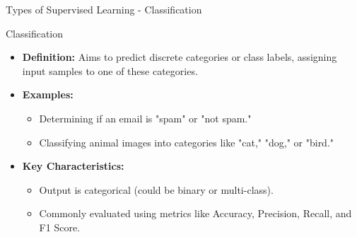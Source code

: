 \documentclass[aspectratio=169]{beamer}
\begin{document}
\begin{frame}[fragile]{Types of Supervised Learning - Classification}
    \begin{block}{Classification}
        \begin{itemize}
            \item \textbf{Definition:} Aims to predict discrete categories or class labels, assigning input samples to one of these categories.
            \item \textbf{Examples:} 
                \begin{itemize}
                    \item Determining if an email is "spam" or "not spam."
                    \item Classifying animal images into categories like "cat," "dog," or "bird."
                \end{itemize}
            \item \textbf{Key Characteristics:}
                \begin{itemize}
                    \item Output is categorical (could be binary or multi-class).
                    \item Commonly evaluated using metrics like Accuracy, Precision, Recall, and F1 Score.
                \end{itemize}
        \end{itemize}
    \end{block}
\end{frame}
\end{document}
